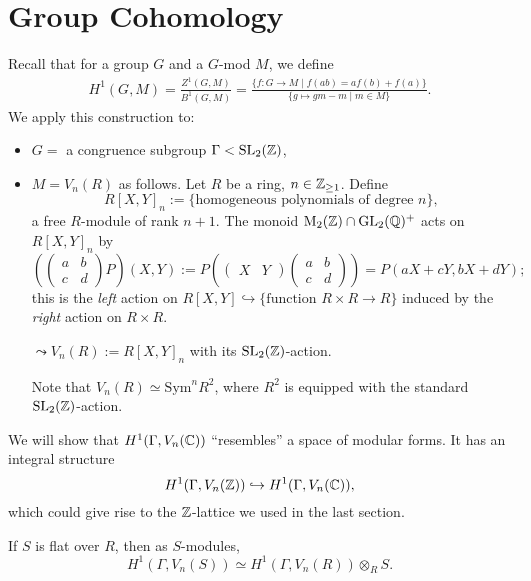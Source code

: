 \section{Group Cohomology}
Recall that for a group $G$ and a $G$-mod $M$,
we define \begin{align*}
    H^1(G, M) = \frac{Z^1(G, M )}{B^1(G, M )}
    = \frac{\{f  :G\to M\mid f(ab) = af(b) + f(a)\}}{\{g\mapsto gm - m\mid m\in M \}}.
\end{align*}
We apply this construction to:\begin{itemize}
    \item $G = $ a congruence subgroup $\Gamma < \operatorname{SL}_2(\mathbb{Z})$,
    \item $M = V_n(R)$ as follows. Let $R$ be a ring, $n\in\mathbb{Z}_{\ge 1}$.
    Define \[R[X, Y]_n := \{\text{homogeneous polynomials of degree }n\},\]
    a free $R$-module of rank $n+1$.
    The monoid $\mathrm{M}_2(\mathbb{Z})\cap\operatorname{GL}_2(\mathbb{Q})^+$ acts on $R[X, Y]_n$ by
    \[\left( \begin{pmatrix}
        a & b\\ c & d
    \end{pmatrix}P \right)(X, Y) := P\left( \begin{pmatrix}
        X & Y 
    \end{pmatrix} \begin{pmatrix}
        a & b \\ c & d
    \end{pmatrix}\right) = P(aX + cY, bX + dY);\]
    this is the \textit{left} action on $R[X, Y]\hookrightarrow \{\text{function } R\times R\to R\}$
    induced by the \textit{right} action on $R\times R$.
    \par $\leadsto V_n(R) := R[X, Y]_n$ with its $\operatorname{SL}_2(\mathbb{Z})$-action.

    Note that $V_n(R)\simeq \mathrm{Sym}^nR^2$, where $R^2$ is equipped with the standard $\operatorname{SL}_2(\mathbb{Z})$-action.
\end{itemize}
We will show that $H^1(\Gamma, V_n(\mathbb{C}))$ ``resembles''
a space of modular forms. It has an integral structure
\[H^1(\Gamma, V_n(\mathbb{Z}))\hookrightarrow H^1(\Gamma, V_n(\mathbb{C})),\]
which could give rise to the $\mathbb{Z}$-lattice we used in the last section.
\begin{proposition}
    If $S$ is flat over $R$, then as $S$-modules,
    \[H^1(\Gamma, V_n(S))\simeq H^1(\Gamma, V_n(R))\otimes_R S. \]
\end{proposition}
